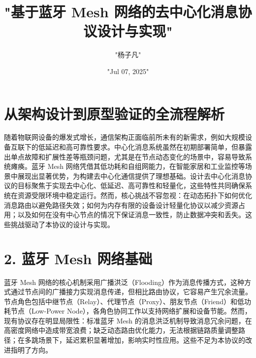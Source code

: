 \title{"基于蓝牙 Mesh 网络的去中心化消息协议设计与实现"}
\author{"杨子凡"}
\date{"Jul 07, 2025"}
\maketitle
\chapter{从架构设计到原型验证的全流程解析}
随着物联网设备的爆发式增长，通信架构正面临前所未有的新需求，例如大规模设备互联下的低延迟和高可靠性要求。中心化消息系统虽然在初期部署简单，但暴露出单点故障和扩展性差等瓶颈问题，尤其是在节点动态变化的场景中，容易导致系统瘫痪。蓝牙 Mesh 网络凭借其低功耗和自组网能力，在智能家居和工业监控等场景中展现出显著优势，为构建去中心化通信提供了理想基础。设计去中心化消息协议的目标聚焦于实现去中心化、低延迟、高可靠性和轻量化，这些特性共同确保系统在资源受限环境中稳定运行。然而，核心挑战不容忽视：在动态拓扑下如何优化消息路由以避免路径失效；如何为内存有限的设备设计轻量化协议以减少资源占用；以及如何在没有中心节点的情况下保证消息一致性，防止数据冲突和丢失。这些挑战驱动了本协议的设计与实现。\par
\chapter{2. 蓝牙 Mesh 网络基础}
蓝牙 Mesh 网络的核心机制采用广播洪泛（Flooding）作为消息传播方式，这种方式通过节点间的广播接力实现消息传递，但相比路由协议，它容易产生冗余流量。节点角色包括中继节点（Relay）、代理节点（Proxy）、朋友节点（Friend）和低功耗节点（Low-Power Node），各角色协同工作以支持网络扩展和设备节能。然而，现有协议存在明显局限性：标准蓝牙 Mesh 的消息洪泛机制导致消息冗余问题，在高密度网络中造成带宽浪费；缺乏动态路由优化能力，无法根据链路质量调整路径；在多跳场景下，延迟累积显著增加，影响实时性应用。这些不足为本协议的改进指明了方向。\par
